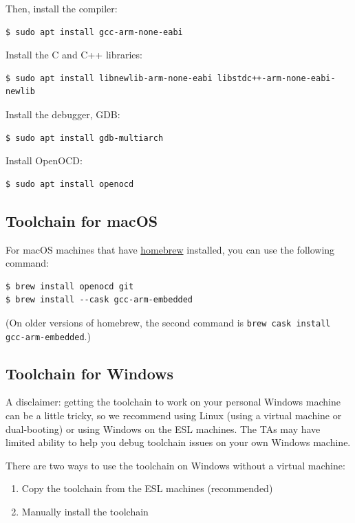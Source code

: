 Then, install the compiler:
%
\begin{verbatim}
$ sudo apt install gcc-arm-none-eabi
\end{verbatim}

Install the C and C++ libraries:
%
\begin{verbatim}
$ sudo apt install libnewlib-arm-none-eabi libstdc++-arm-none-eabi-newlib
\end{verbatim}

Install the debugger, GDB:
%
\begin{verbatim}
$ sudo apt install gdb-multiarch
\end{verbatim}

Install OpenOCD:
%
\begin{verbatim}
$ sudo apt install openocd
\end{verbatim}

\subsection{Toolchain for macOS}

For macOS machines that have \href{https://brew.sh}{homebrew}
installed, you can use the following command:

\begin{verbatim}
$ brew install openocd git
$ brew install --cask gcc-arm-embedded
\end{verbatim}

(On older versions of homebrew, the second command is
\verb|brew cask install gcc-arm-embedded|.)

\subsection{Toolchain for Windows}

A disclaimer: getting the toolchain to work on your personal Windows machine
can be a little tricky, so we recommend using Linux (using a virtual machine
or dual-booting) or using Windows on the ESL machines. The TAs may have
limited ability to help you debug toolchain issues on your own Windows
machine.

There are two ways to use the toolchain on Windows without a virtual machine:
\begin{enumerate}
  \item Copy the toolchain from the ESL machines (recommended)
  \item Manually install the toolchain
\end{enumerate}

